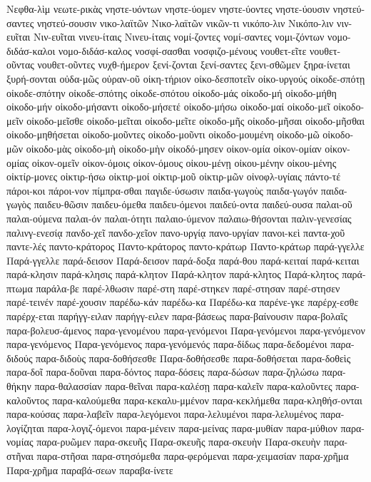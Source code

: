 {Νεφθα-λὶμ
νεωτε-ρικὰς
νηστε-υόντων
νηστε-ύομεν
νηστε-ύοντες
νηστε-ύουσιν
νηστεύ-σαντες
νηστεύ-σουσιν
νικο-λαϊτῶν
Νικο-λαϊτῶν
νικῶν-τι
νικόπο-λιν
Νικόπο-λιν
νιν-ευῖται
Νιν-ευῖται
νινευ-ίταις
Νινευ-ίταις
νομί-ζοντες
νομί-σαντες
νομι-ζόντων
νομο-διδάσ-καλοι
νομο-διδάσ-καλος
νοσφί-σασθαι
νοσφιζο-μένους
νουθετ-εῖτε
νουθετ-οῦντας
νουθετ-οῦντες
νυχθ-ήμερον
ξενί-ζονται
ξενί-σαντες
ξενι-σθῶμεν
ξηρα-ίνεται
ξυρή-σονται
οὐδα-μῶς
οὐραν-οῦ
οἰκη-τήριον
οἰκο-δεσποτεῖν
οἰκο-υργούς
οἰκοδε-σπότῃ
οἰκοδε-σπότην
οἰκοδε-σπότης
οἰκοδε-σπότου
οἰκοδο-μάς
οἰκοδο-μή
οἰκοδο-μήθη
οἰκοδο-μήν
οἰκοδο-μήσαντι
οἰκοδο-μήσετέ
οἰκοδο-μήσω
οἰκοδο-μαί
οἰκοδο-μεῖ
οἰκοδο-μεῖν
οἰκοδο-μεῖσθε
οἰκοδο-μεῖται
οἰκοδο-μεῖτε
οἰκοδο-μῆς
οἰκοδο-μῆσαι
οἰκοδο-μῆσθαι
οἰκοδο-μηθήσεται
οἰκοδο-μοῦντες
οἰκοδο-μοῦντι
οἰκοδο-μουμένη
οἰκοδο-μῶ
οἰκοδο-μῶν
οἰκοδο-μὰς
οἰκοδο-μὴ
οἰκοδο-μὴν
οἰκοδό-μησεν
οἰκον-ομία
οἰκον-ομίαν
οἰκον-ομίας
οἰκον-ομεῖν
οἰκον-όμοις
οἰκον-όμους
οἰκου-μένῃ
οἰκου-μένην
οἰκου-μένης
οἰκτίρ-μονες
οἰκτιρ-ήσω
οἰκτιρ-μοί
οἰκτιρ-μοῦ
οἰκτιρ-μῶν
οἰνοφλ-υγίαις
πάντο-τέ
πάροι-κοι
πάροι-νον
πίμπρα-σθαι
παγιδε-ύσωσιν
παιδα-γωγοὺς
παιδα-γωγόν
παιδα-γωγὸς
παιδευ-θῶσιν
παιδευ-όμεθα
παιδευ-όμενοι
παιδεύ-οντα
παιδεύ-ουσα
παλαι-οῦ
παλαι-ούμενα
παλαι-όν
παλαι-ότητι
παλαιο-ύμενον
παλαιω-θήσονται
παλιν-γενεσίας
παλινγ-ενεσίᾳ
πανδο-χεῖ
πανδο-χεῖον
πανο-υργίᾳ
πανο-υργίαν
πανοι-κεὶ
παντα-χοῦ
παντε-λές
παντο-κράτορος
Παντο-κράτορος
παντο-κράτωρ
Παντο-κράτωρ
παρά-γγελλε
Παρά-γγελλε
παρά-δεισον
Παρά-δεισον
παρά-δοξα
παρά-θου
παρά-κειταί
παρά-κειται
παρά-κλησιν
παρά-κλησις
παρά-κλητον
Παρά-κλητον
παρά-κλητος
Παρά-κλητος
παρά-πτωμα
παράλα-βε
παρέ-λθωσιν
παρέ-στη
παρέ-στηκεν
παρέ-στησαν
παρέ-στησεν
παρέ-τεινέν
παρέ-χουσιν
παρέδω-κάν
παρέδω-κα
Παρέδω-κα
παρένε-γκε
παρέρχ-εσθε
παρέρχ-εται
παρήγγ-ειλαν
παρήγγ-ειλεν
παρα-βάσεως
παρα-βαίνουσιν
παρα-βολαῖς
παρα-βολευσ-άμενος
παρα-γενομένου
παρα-γενόμενοι
Παρα-γενόμενοι
παρα-γενόμενον
παρα-γενόμενος
Παρα-γενόμενος
παρα-γενόμενός
παρα-δίδως
παρα-δεδομένοι
παρα-διδούς
παρα-διδοὺς
παρα-δοθήσεσθε
Παρα-δοθήσεσθε
παρα-δοθήσεται
παρα-δοθεὶς
παρα-δοῖ
παρα-δοῦναι
παρα-δόντος
παρα-δόσεις
παρα-δώσων
παρα-ζηλώσω
παρα-θήκην
παρα-θαλασσίαν
παρα-θεῖναι
παρα-καλέσῃ
παρα-καλεῖν
παρα-καλοῦντες
παρα-καλοῦντος
παρα-καλούμεθα
παρα-κεκαλυ-μμένον
παρα-κεκλήμεθα
παρα-κληθήσ-ονται
παρα-κούσας
παρα-λαβεῖν
παρα-λεγόμενοι
παρα-λελυμένοι
παρα-λελυμένος
παρα-λογίζηται
παρα-λογιζ-όμενοι
παρα-μένειν
παρα-μείνας
παρα-μυθίαν
παρα-μύθιον
παρα-νομίας
παρα-ρυῶμεν
παρα-σκευῆς
Παρα-σκευῆς
παρα-σκευὴν
Παρα-σκευὴν
παρα-στῆναι
παρα-στῆσαι
παρα-στησόμεθα
παρα-φερόμεναι
παρα-χειμασίαν
παρα-χρῆμα
Παρα-χρῆμα
παραβά-σεων
παραβα-ίνετε
}

